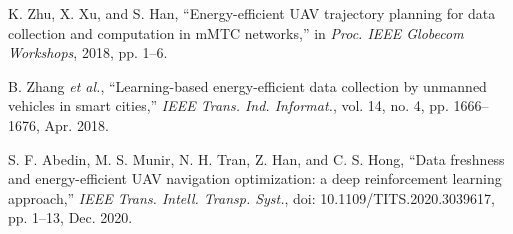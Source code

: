 \documentclass[journal]{IEEEtran}
\begin{document}
\begin{thebibliography}{1}
     {K. Zhu, X. Xu, and S. Han, ``Energy-efficient UAV trajectory planning for data collection and computation in mMTC networks,'' in \emph{Proc. IEEE Globecom Workshops}, 2018, pp. 1--6.}















      B. Zhang \emph{et al.}, ``Learning-based energy-efficient data collection by unmanned vehicles in smart cities,''  \emph{IEEE Trans. Ind. Informat.}, vol. 14, no. 4, pp. 1666--1676, Apr. 2018.


      {S. F. Abedin, M. S. Munir, N. H. Tran, Z. Han, and C. S. Hong, ``Data freshness and energy-efficient UAV navigation optimization: a deep reinforcement learning approach,''  \emph{IEEE Trans. Intell. Transp. Syst.}, doi: 10.1109/TITS.2020.3039617, pp. 1--13, Dec. 2020.}





\end{thebibliography}
\end{document}
